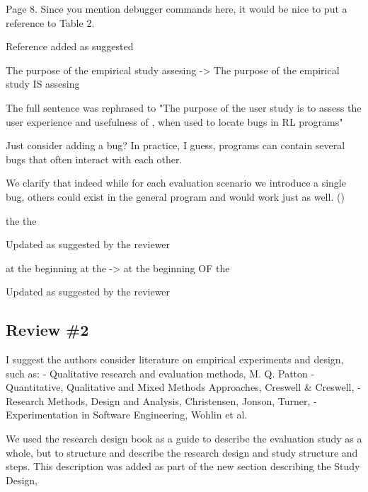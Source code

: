 \begin{remark}
Page 8. Since you mention debugger commands here, it would be nice to put a reference to Table 2.
\end{remark}
\begin{solved}
Reference added as suggested
\end{solved}

\begin{remark}
The purpose of the empirical study assesing -> The purpose of the empirical study IS assesing
\end{remark}
\begin{solved}
The full sentence was rephrased to "The purpose of the user study is to assess the user experience 
and usefulness of \flik, when used to locate bugs in \ac{RL} programs"
\end{solved}

\begin{remark}\label{rem:one-bug}
Just consider adding a bug? In practice, I guess, programs can contain several bugs that often interact with each other.
\end{remark}
\begin{solved}
We clarify that indeed while for each evaluation scenario we introduce a single bug, others could exist in the general program and \flik would work just as well. ()
\end{solved}

\begin{remark}
the the
\end{remark}
\begin{solved}
Updated as suggested by the reviewer
\end{solved}

\begin{remark}
at the beginning at the -> at the beginning OF the
\end{remark}
\begin{solved}
Updated as suggested by the reviewer
\end{solved}



\subsection{Review \#2}

\begin{remark}
I suggest the authors consider literature on empirical experiments and design, such as:
- Qualitative research and evaluation methods, M. Q. Patton
- Quantitative, Qualitative and Mixed Methods Approaches, Creswell \& Creswell,
- Research Methods, Design and Analysis, Christensen, Jonson, Turner,
- Experimentation in Software Engineering, Wohlin et al.
\end{remark}
\begin{solved}
We used the research design book as a guide to describe the evaluation study as a whole, but to structure and describe the research design and study structure and steps. This description was added as part of the new section describing the Study Design,  
\end{solved}

